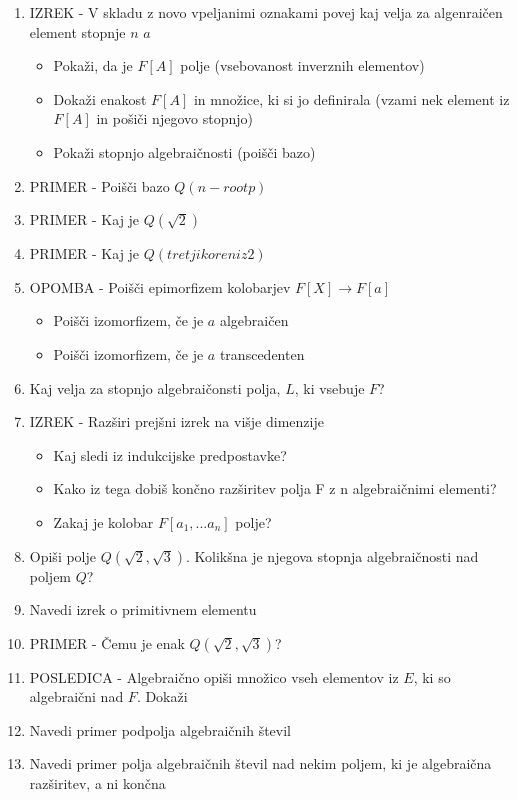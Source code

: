 \documentclass{article}
\begin{document}
\begin{enumerate}
        \item IZREK - V skladu z novo vpeljanimi oznakami povej kaj velja za algenraičen element stopnje $n$ $a$
        \begin{itemize}
            \item Pokaži, da je $F[A]$ polje (vsebovanost inverznih elementov)
            \item Dokaži enakost $F[A]$ in množice, ki si jo definirala (vzami nek element iz $F[A]$ in pošiči njegovo stopnjo)
            \item Pokaži stopnjo algebraičnosti (poišči bazo)
        \end{itemize}
        \item PRIMER - Poišči bazo $Q(n-root{p})$
        \item PRIMER - Kaj je $Q(\sqrt{2})$
        \item PRIMER - Kaj je $Q(tretji koren iz 2)$
        \item OPOMBA - Poišči epimorfizem kolobarjev $F[X] \rightarrow F[a]$
        \begin{itemize}
            \item Poišči izomorfizem, če je $a$ algebraičen
            \item Poišči izomorfizem, če je $a$ transcedenten
        \end{itemize}
        \item Kaj velja za stopnjo algebraičonsti polja, $L$, ki vsebuje $F$?
        \item IZREK - Razširi prejšni izrek na višje dimenzije
        \begin{itemize}
            \item Kaj sledi iz indukcijske predpostavke?
            \item Kako iz tega dobiš končno razširitev polja F z n algebraičnimi elementi?
            \item Zakaj je kolobar $F[a_1, ... a_n]$ polje?
        \end{itemize}
        \item Opiši polje $Q(\sqrt{2}, \sqrt{3})$. Kolikšna je njegova stopnja algebraičnosti nad poljem $Q$?
        \item Navedi izrek o primitivnem elementu
        \item PRIMER - Čemu je enak $Q(\sqrt{2}, \sqrt{3})$?
        \item POSLEDICA - Algebraično opiši množico vseh elementov iz $E$, ki so algebraični nad $F$. Dokaži
        \item Navedi primer podpolja algebraičnih števil
        \item Navedi primer polja algebraičnih števil nad nekim poljem, ki je algebraična razširitev, a ni končna
    \end{enumerate}
\end{document}
